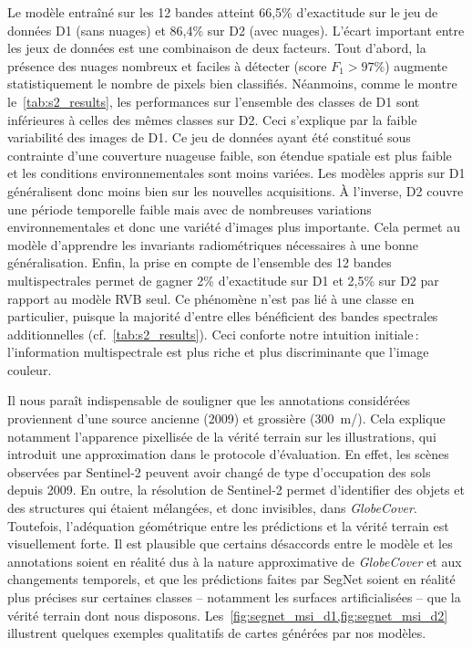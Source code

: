 Le modèle entraîné sur les 12 bandes atteint 66,5\% d'exactitude sur le jeu de données D1 (sans nuages) et 86,4\% sur D2 (avec nuages). L'écart important entre les jeux de données est une combinaison de deux facteurs. Tout d'abord, la présence des nuages nombreux et faciles à détecter (score $F_1 > 97\%$) augmente statistiquement le nombre de pixels bien classifiés. Néanmoins, comme le montre le~\cref{tab:s2_results}, les performances sur l'ensemble des classes de D1 sont inférieures à celles des mêmes classes sur D2. Ceci s'explique par la faible variabilité des images de D1. Ce jeu de données ayant été constitué sous contrainte d'une couverture nuageuse faible, son étendue spatiale est plus faible et les conditions environnementales sont moins variées. Les modèles appris sur D1 généralisent donc moins bien sur les nouvelles acquisitions. À l'inverse, D2 couvre une période temporelle faible mais avec de nombreuses variations environnementales et donc une variété d'images plus importante. Cela permet au modèle d'apprendre les invariants radiométriques nécessaires à une bonne généralisation.
Enfin, la prise en compte de l'ensemble des 12 bandes multispectrales permet de gagner 2\% d'exactitude sur D1 et 2,5\% sur D2 par rapport au modèle \gls{RVB} seul. Ce phénomène n'est pas lié à une classe en particulier, puisque la majorité d'entre elles bénéficient des bandes spectrales additionnelles (cf.~\cref{tab:s2_results}). Ceci conforte notre intuition initiale\,: l'information multispectrale est plus riche et plus discriminante que l'image couleur.

Il nous paraît indispensable de souligner que les annotations considérées proviennent d'une source ancienne (2009) et grossière (\SI{300}{\meter/\px}). Cela explique notamment l'apparence pixellisée de la vérité terrain sur les illustrations, qui introduit une approximation dans le protocole d'évaluation. En effet, les scènes observées par Sentinel-2 peuvent avoir changé de type d'occupation des sols depuis 2009. En outre, la résolution de Sentinel-2 permet d'identifier des objets et des structures qui étaient mélangées, et donc invisibles, dans \emph{GlobeCover}. Toutefois, l'adéquation géométrique entre les prédictions et la vérité terrain est visuellement forte. Il est plausible que certains désaccords entre le modèle et les annotations soient en réalité dus à la nature approximative de \emph{GlobeCover} et aux changements temporels, et que les prédictions faites par SegNet soient en réalité plus précises sur certaines classes -- notamment les surfaces artificialisées -- que la vérité terrain dont nous disposons. Les~\cref{fig:segnet_msi_d1,fig:segnet_msi_d2} illustrent quelques exemples qualitatifs de cartes générées par nos modèles.

